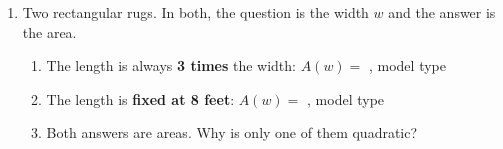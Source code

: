\documentclass[10pt]{article}
\begin{document}
\begin{enumerate}[itemsep=10pt]
\item Two rectangular rugs. In both, the question is the width $w$ and the
      answer is the area.

\begin{enumerate}[label=(\alph*), itemsep=4pt]
  \item The length is always \textbf{3 times} the width: \quad
        $A(w) = $ , \quad model type 
  \item The length is \textbf{fixed at 8 feet}: \quad
        $A(w) = $ , \quad model type 
  \item Both answers are areas. Why is only one of them quadratic?

\end{enumerate}

\end{enumerate}
\end{document}
